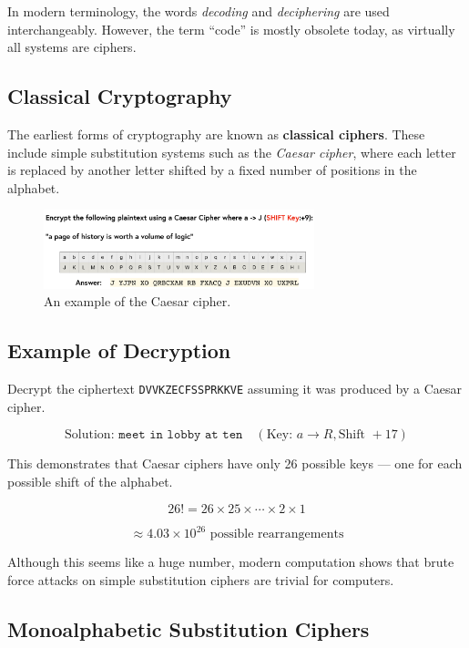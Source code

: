 In modern terminology, the words \emph{decoding} and \emph{deciphering} are used interchangeably. However, the term “code” is mostly obsolete today, as virtually all systems are ciphers.

\subsection{Classical Cryptography}

The earliest forms of cryptography are known as \textbf{classical ciphers}. These include simple substitution systems such as the \emph{Caesar cipher}, where each letter is replaced by another letter shifted by a fixed number of positions in the alphabet.  

\begin{figure}[h!]
\centering
\includegraphics[width=0.7\textwidth]{Pictures/encrypt example.png}
\caption{An example of the Caesar cipher.}
\label{fig:caesar_cipher}
\end{figure}


\subsection{Example of Decryption}

Decrypt the ciphertext \texttt{DVVKZECFSSPRKKVE} assuming it was produced by a Caesar cipher.

\[
\text{Solution: } \texttt{meet in lobby at ten} \quad (\text{Key: } a \rightarrow R, \text{Shift } +17)
\]

This demonstrates that Caesar ciphers have only 26 possible keys — one for each possible shift of the alphabet.

\[
26! = 26 \times 25 \times \cdots \times 2 \times 1
\]

\[
\approx 4.03 \times 10^{26} \text{ possible rearrangements}
\]

Although this seems like a huge number, modern computation shows that brute force attacks on simple substitution ciphers are trivial for computers.

\subsection{Monoalphabetic Substitution Ciphers}

